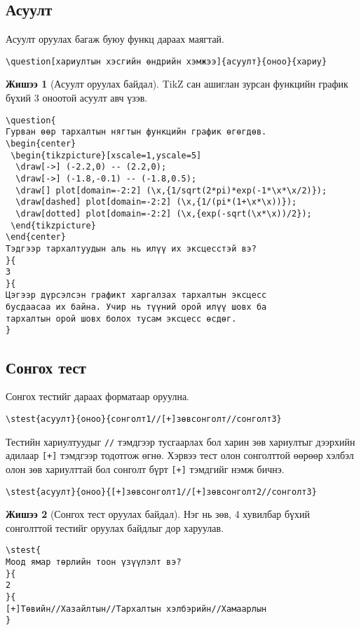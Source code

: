 \documentclass[10pt]{article}
\theoremstyle{definition}
\newtheorem{example}{Жишээ}
\begin{document}
\subsection{Асуулт}

Асуулт оруулах багаж буюу функц дараах маягтай.
\begin{verbatim}
\question[хариултын хэсгийн өндрийн хэмжээ]{асуулт}{оноо}{хариу}
\end{verbatim}

\begin{example}[Асуулт оруулах байдал]
TikZ сан ашиглан зурсан функцийн график бүхий 3 оноотой асуулт авч үзэв.
\begin{verbatim}
\question{
Гурван өөр тархалтын нягтын функцийн график өгөгдөв.
\begin{center}
 \begin{tikzpicture}[xscale=1,yscale=5]
  \draw[->] (-2.2,0) -- (2.2,0);
  \draw[->] (-1.8,-0.1) -- (-1.8,0.5);
  \draw[] plot[domain=-2:2] (\x,{1/sqrt(2*pi)*exp(-1*\x*\x/2)});
  \draw[dashed] plot[domain=-2:2] (\x,{1/(pi*(1+\x*\x))});
  \draw[dotted] plot[domain=-2:2] (\x,{exp(-sqrt(\x*\x))/2});
 \end{tikzpicture}
\end{center}
Тэдгээр тархалтуудын аль нь илүү их эксцесстэй вэ?
}{
3
}{
Цэгээр дүрсэлсэн графикт харгалзах тархалтын эксцесс 
бусдаасаа их байна. Учир нь түүний орой илүү шовх ба
тархалтын орой шовх болох тусам эксцесс өсдөг.
}
\end{verbatim}
\end{example}

\subsection{Сонгох тест}

Сонгох тестийг дараах форматаар оруулна.
\begin{verbatim}
\stest{асуулт}{оноо}{сонголт1//[+]зөвсонголт//сонголт3}
\end{verbatim}
Тестийн хариултуудыг \texttt{//} тэмдгээр тусгаарлах бол харин зөв хариултыг дээрхийн адилаар \texttt{[+]} тэмдгээр тодотгож өгнө. Хэрвээ тест олон сонголттой өөрөөр хэлбэл олон зөв хариулттай бол сонголт бүрт \texttt{[+]} тэмдгийг нэмж бичнэ.
\begin{verbatim}
\stest{асуулт}{оноо}{[+]зөвсонголт1//[+]зөвсонголт2//сонголт3}
\end{verbatim}

\begin{example}[Сонгох тест оруулах байдал]
Нэг нь зөв, 4 хувилбар бүхий сонголттой тестийг оруулах байдлыг дор харуулав.
\begin{verbatim}
\stest{
Моод ямар төрлийн тоон үзүүлэлт вэ?
}{
2
}{
[+]Төвийн//Хазайлтын//Тархалтын хэлбэрийн//Хамаарлын
}
\end{verbatim}
\end{example}
\end{document}

